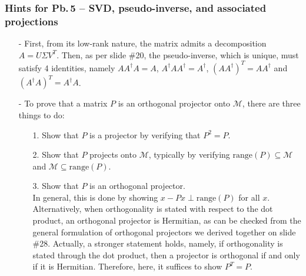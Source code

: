 \documentclass[letterpaper,10pt]{article}
\begin{document}
\subsubsection*{Hints for Pb.$\,$5 -- SVD, pseudo-inverse, and associated projections}
\begin{itemize}
\item[-] First, from its low-rank nature, the matrix admits a decomposition $A=U\Sigma V^T$.
Then, as per slide \#20, the pseudo-inverse, which is unique, must satisfy 4 identities, namely $AA^\dagger A=A$, $A^\dagger AA^\dagger=A^\dagger$, $(AA^\dagger)^T=AA^\dagger$ and $(A^\dagger A)^T=A^\dagger A$.
\item[-] To prove that a matrix $P$ is an orthogonal projector onto $\mathcal{M}$, there are three things to do:
\begin{itemize}
\item[1.] Show that $P$ is a projector by verifying that $P^2=P$.
\item[2.] Show that $P$ projects onto $\mathcal{M}$, typically by verifying $\mathrm{range}(P)\subseteq \mathcal{M}$ and $\mathcal{M}\subseteq \mathrm{range}(P)$.
\item[3.] Show that $P$ is an orthogonal projector.\vspace{.1cm}\\
In general, this is done by showing $x-Px\perp\mathrm{range}(P)$ for all $x$.\vspace{.1cm}\\
Alternatively, when orthogonality is stated with respect to the dot product, an orthogonal projector is Hermitian, as can be checked from the general formulation of orthogonal projectors we derived together on slide \#28.
Actually, a stronger statement holds, namely, if orthogonality is stated through the dot product, then a projector is orthogonal if and only if it is Hermitian.
Therefore, here, it suffices to show $P^T=P$.
\end{itemize}
\end{itemize}
\end{document}
